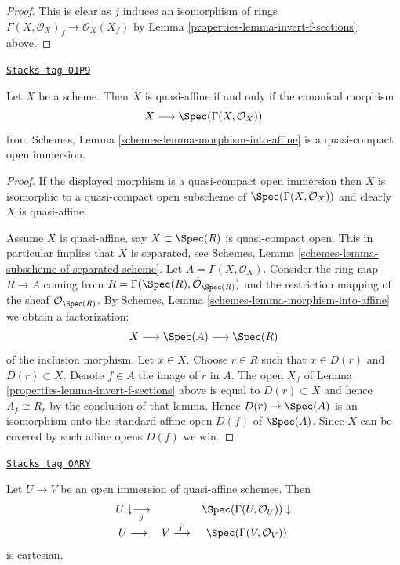 \begin{proof}

This is clear as $j$ induces an isomorphism of rings
$\Gamma(X, \mathcal{O}_X)_f \to \mathcal{O}_X(X_f)$ by
Lemma \ref{properties-lemma-invert-f-sections} above.
\end{proof}

\begin{lemma}
\label{properties-lemma-quasi-affine}
\href{https://stacks.math.columbia.edu/tag/01P9}{\texttt{Stacks tag 01P9}}

Let $X$ be a scheme. Then $X$ is quasi-affine if and only if
the canonical morphism
$$
X \longrightarrow \Spec(\Gamma(X, \mathcal{O}_X))
$$
from Schemes, Lemma \ref{schemes-lemma-morphism-into-affine} is
a quasi-compact open immersion.
\end{lemma}

\begin{proof}

If the displayed morphism is a quasi-compact open immersion then
$X$ is isomorphic to a quasi-compact open subscheme of
$\Spec(\Gamma(X, \mathcal{O}_X))$ and clearly $X$ is quasi-affine.

\medskip\noindent
Assume $X$ is quasi-affine, say $X \subset \Spec(R)$ is
quasi-compact open. This in particular implies that $X$ is
separated, see
Schemes, Lemma \ref{schemes-lemma-subscheme-of-separated-scheme}.
Let $A = \Gamma(X, \mathcal{O}_X)$.
Consider the ring map $R \to A$ coming from
$R = \Gamma(\Spec(R), \mathcal{O}_{\Spec(R)})$
and the restriction mapping of the sheaf $\mathcal{O}_{\Spec(R)}$.
By Schemes, Lemma \ref{schemes-lemma-morphism-into-affine}
we obtain a factorization:
$$
X \longrightarrow
\Spec(A) \longrightarrow
\Spec(R)
$$
of the inclusion morphism. Let $x \in X$. Choose $r \in R$ such that
$x \in D(r)$ and $D(r) \subset X$. Denote $f \in A$ the image of $r$
in $A$. The open $X_f$ of Lemma \ref{properties-lemma-invert-f-sections}
above is equal to $D(r) \subset X$ and hence $A_f \cong R_r$ by the
conclusion of that lemma.
Hence $D(r) \to \Spec(A)$ is an isomorphism onto the
standard affine open $D(f)$ of $\Spec(A)$. Since $X$
can be covered by such affine opens $D(f)$ we win.
\end{proof}

\begin{lemma}
\label{properties-lemma-cartesian-diagram-quasi-affine}
\href{https://stacks.math.columbia.edu/tag/0ARY}{\texttt{Stacks tag 0ARY}}

Let $U \to V$ be an open immersion of quasi-affine schemes. Then
$$
\begin{array}{ccc}U \downarrow\underset{j}{\longrightarrow} &  & \Spec(\Gamma(U, \mathcal{O}_U)) \downarrow \\ U \longrightarrow & V \overset{j'}{\longrightarrow} & \Spec(\Gamma(V, \mathcal{O}_V))\end{array}
$$
is cartesian.
\end{lemma}

